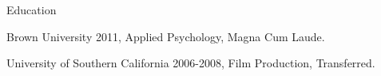 \documentclass[12pt]{res}
\begin{document}
{\begin{resume}
\begin{list}{}{\leftmargin=1em}
{\begin{list}{-}{\leftmargin=1em}
\end{list}}
\item
\item{\centering Education
\item 
\item
\begin{list}{-}{\leftmargin=1em}
\item Brown University 2011, Applied Psychology, Magna Cum Laude. 
\item University of Southern California 2006-2008, Film Production, Transferred. 
\end{list}}
\item
\item
\item
\item
\end{list}

\end{resume}
} %
\end{document}
